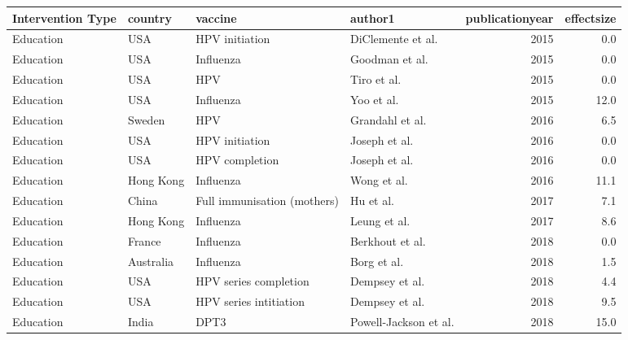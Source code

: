 
\begin{tabular}{llllrr}
\toprule
Intervention Type & country & vaccine & author1 & publicationyear & effectsize\\
\midrule
Education & USA & HPV initiation & DiClemente et al. & 2015 & 0.0\\
Education & USA & Influenza & Goodman et al. & 2015 & 0.0\\
Education & USA & HPV & Tiro et al. & 2015 & 0.0\\
Education & USA & Influenza & Yoo et al. & 2015 & 12.0\\
Education & Sweden & HPV & Grandahl et al. & 2016 & 6.5\\
\addlinespace
Education & USA & HPV initiation & Joseph et al. & 2016 & 0.0\\
Education & USA & HPV completion & Joseph et al. & 2016 & 0.0\\
Education & Hong Kong & Influenza & Wong et al. & 2016 & 11.1\\
Education & China & Full immunisation (mothers) & Hu et al. & 2017 & 7.1\\
Education & Hong Kong & Influenza & Leung et al. & 2017 & 8.6\\
\addlinespace
Education & France & Influenza & Berkhout et al. & 2018 & 0.0\\
Education & Australia & Influenza & Borg et al. & 2018 & 1.5\\
Education & USA & HPV series completion & Dempsey et al. & 2018 & 4.4\\
Education & USA & HPV series intitiation & Dempsey et al. & 2018 & 9.5\\
Education & India & DPT3 & Powell-Jackson et al. & 2018 & 15.0\\
\bottomrule
\end{tabular}
